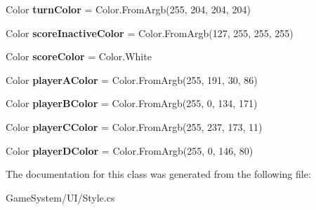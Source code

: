 \begin{DoxyCompactItemize}
\item 
Color {\bfseries turn\+Color} = Color.\+From\+Argb(255, 204, 204, 204)\hypertarget{classhoppin_1_1_game_system_1_1_u_i_1_1_style_a7129c567d3fc4ce13d76fe958cd24be7}{}\label{classhoppin_1_1_game_system_1_1_u_i_1_1_style_a7129c567d3fc4ce13d76fe958cd24be7}

\item 
Color {\bfseries score\+Inactive\+Color} = Color.\+From\+Argb(127, 255, 255, 255)\hypertarget{classhoppin_1_1_game_system_1_1_u_i_1_1_style_ae3b2ce83a09717f9cc120beeadb1803b}{}\label{classhoppin_1_1_game_system_1_1_u_i_1_1_style_ae3b2ce83a09717f9cc120beeadb1803b}

\item 
Color {\bfseries score\+Color} = Color.\+White\hypertarget{classhoppin_1_1_game_system_1_1_u_i_1_1_style_ae70c0b59f4b4c46e8b607d3f0bc7355a}{}\label{classhoppin_1_1_game_system_1_1_u_i_1_1_style_ae70c0b59f4b4c46e8b607d3f0bc7355a}

\item 
Color {\bfseries player\+A\+Color} = Color.\+From\+Argb(255, 191, 30, 86)\hypertarget{classhoppin_1_1_game_system_1_1_u_i_1_1_style_a9beeae8f40f2dd52da47f721e1aae5f5}{}\label{classhoppin_1_1_game_system_1_1_u_i_1_1_style_a9beeae8f40f2dd52da47f721e1aae5f5}

\item 
Color {\bfseries player\+B\+Color} = Color.\+From\+Argb(255, 0, 134, 171)\hypertarget{classhoppin_1_1_game_system_1_1_u_i_1_1_style_af9075232db5b4f2474396195833ac1f9}{}\label{classhoppin_1_1_game_system_1_1_u_i_1_1_style_af9075232db5b4f2474396195833ac1f9}

\item 
Color {\bfseries player\+C\+Color} = Color.\+From\+Argb(255, 237, 173, 11)\hypertarget{classhoppin_1_1_game_system_1_1_u_i_1_1_style_aaca65216a76dff0d9a88eb4796cb2bd2}{}\label{classhoppin_1_1_game_system_1_1_u_i_1_1_style_aaca65216a76dff0d9a88eb4796cb2bd2}

\item 
Color {\bfseries player\+D\+Color} = Color.\+From\+Argb(255, 0, 146, 80)\hypertarget{classhoppin_1_1_game_system_1_1_u_i_1_1_style_a6622111d080eb569f679ed415f730c1f}{}\label{classhoppin_1_1_game_system_1_1_u_i_1_1_style_a6622111d080eb569f679ed415f730c1f}

\end{DoxyCompactItemize}


The documentation for this class was generated from the following file\+:\begin{DoxyCompactItemize}
\item 
Game\+System/\+U\+I/Style.\+cs\end{DoxyCompactItemize}
